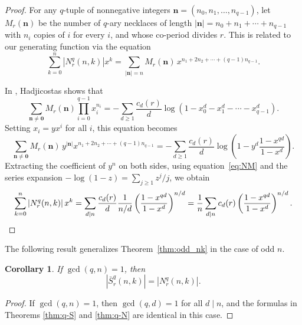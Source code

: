 \documentclass[12pt]{article}
\newcommand{\card}[1]{\left|#1\right|}
\newcommand{\bS}{\bar{S}}
\newtheorem{corollary}[theorem]{Corollary}
\theoremstyle{definition}
\begin{document}
\begin{proof}
    For any $q$-tuple of nonnegative integers $\mathbf{n} = (n_0, n_1, \dots,
    n_{q - 1})$, let $M_r(\mathbf{n})$ be the number of $q$-ary necklaces of
    length $|\mathbf{n}| = n_0 + n_1 + \cdots + n_{q - 1}$
    with $n_i$ copies of $i$ for every $i$, and whose co-period divides
    $r$. This is related to our generating function via the equation
    \begin{equation}\label{eq:NM}
        \sum_{k=0}^n \card{N_r^q(n, k)} x^k = \sum_{|\mathbf{n}| = n} M_r(\mathbf{n})\, x^{n_1 + 2 n_2 + \cdots + (q - 1) n_{q - 1}}.
    \end{equation}

    In \cite[Thm.~1, eq.~(18)]{hadji-necklaces}, %
    Hadjicostas shows that
    \begin{equation*}
        \sum_{\mathbf{n} \neq \mathbf{0}} M_r(\mathbf{n}) \prod_{i = 0}^{q - 1} x_i^{n_i} = - \sum_{d \geq 1} \frac{c_d(r)}{d} \log(1 - x_0^d - x_1^d - \cdots - x_{q - 1}^d).
    \end{equation*}
    Setting $x_i = yx^i$ for all $i$, this equation becomes
    \[
        \sum_{\mathbf{n} \neq \mathbf{0}} M_r(\mathbf{n})\, y^{|\mathbf{n}|} x^{n_1 + 2 n_2 + \cdots + (q - 1) n_{q - 1}}
        = - \sum_{d \geq 1} \frac{c_d(r)}{d} \log\left(1 - y^d \frac{1 - x^{qd}}{1 - x^d}\right).
    \]
    Extracting the coefficient of $y^n$ on both sides, using equation~\eqref{eq:NM} and the series expansion $-\log(1-z)=\sum_{j\ge1}z^j/j$, we obtain
    \[
        \sum_{k=0}^n \card{N_r^q(n, k)} x^k 
        =
        \sum_{d\mid n} \frac{c_d(r)}{d} \frac{1}{n/d} \left(\frac{1 - x^{qd}}{1 - x^d}\right)^{n/d}
        =
        \frac{1}{n} \sum_{d\mid n} c_d(r) \left(\frac{1 - x^{qd}}{1 - x^d}\right)^{n/d}.\qedhere
    \]
\end{proof}

The following result generalizes Theorem~\ref{thm:odd_nk} in the case of odd $n$.


\begin{corollary}\label{cor:q-ary}
    If $\gcd(q,n)=1$, then
    $$\card{\bS_r^q(n, k)} = \card{N_r^q(n,k)}.$$ 
\end{corollary}

\begin{proof}
    If $\gcd(q, n) = 1$, then $\gcd(q, d) = 1$ for all $d \mid n$, and the formulas in Theorems \ref{thm:q-S} and
    \ref{thm:q-N} are identical in this case.
\end{proof}
\end{document}
